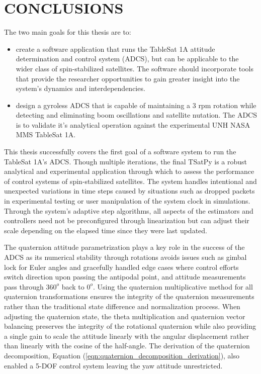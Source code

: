 \chapter{CONCLUSIONS}
\label{chap:Conclusions}

The two main goals for this thesis are to:

\begin{itemize}
\item create a software application that runs the TableSat 1A attitude determination and control system (ADCS), but can be applicable to the wider class of spin-stabilized satellites.  The software should incorporate tools that provide the researcher opportunities to gain greater insight into the system's dynamics and interdependencies.
\item design a gyroless ADCS that is capable of maintaining a 3 rpm rotation while detecting and eliminating boom oscillations and satellite nutation.  The ADCS is to validate it's analytical operation against the experimental UNH NASA MMS TableSat 1A.
\end{itemize}

This thesis successfully covers the first goal of a software system to run the TableSat 1A's ADCS.  Though multiple iterations, the final TSatPy is a robust analytical and experimental application through which to assess the performance of control systems of spin-stabilized satellites.  The system handles intentional and unexpected variations in time steps caused by situations such as dropped packets in experimental testing or user manipulation of the system clock in simulations.  Through the system's adaptive step algorithms, all aspects of the estimators and controllers need not be preconfigured through linearization but can adjust their scale depending on the elapsed time since they were last updated.

The quaternion attitude parametrization plays a key role in the success of the ADCS as its numerical stability through rotations avoids issues such as gimbal lock for Euler angles and gracefully handled edge cases where control efforts switch direction upon passing the antipodal point, and attitude measurements pass through $360^o$ back to $0^o$.  Using the quaternion multiplicative method for all quaternion transformations ensures the integrity of the quaternion measurements rather than the traditional state difference and normalization process.  When adjusting the quaternion state, the theta multiplication and quaternion vector balancing preserves the integrity of the rotational quaternion while also providing a single gain to scale the attitude linearly with the angular displacement rather than linearly with the cosine of the half-angle.  The derivation of the quaternion decomposition, Equation (\ref{eqn:quaternion_decomposition_derivation}), also enabled a 5-DOF control system leaving the yaw attitude unrestricted.

